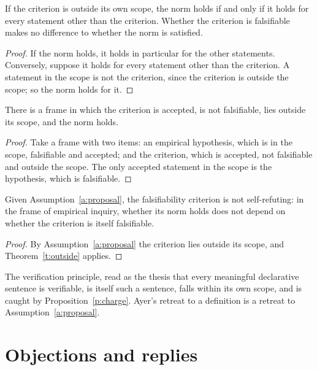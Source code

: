 \documentclass{situationist-preprint}
\begin{document}
\begin{theorem}\label{t:outside}
If the criterion is outside its own scope, the norm holds if and only if it holds for every statement other than the criterion. Whether the criterion is falsifiable makes no difference to whether the norm is satisfied.
\end{theorem}

\begin{proof}
If the norm holds, it holds in particular for the other statements. Conversely, suppose it holds for every statement other than the criterion. A statement in the scope is not the criterion, since the criterion is outside the scope; so the norm holds for it.
\end{proof}

\begin{proposition}[Consistency]\label{p:cons}
There is a frame in which the criterion is accepted, is not falsifiable, lies outside its scope, and the norm holds.
\end{proposition}

\begin{proof}
Take a frame with two items: an empirical hypothesis, which is in the scope, falsifiable and accepted; and the criterion, which is accepted, not falsifiable and outside the scope. The only accepted statement in the scope is the hypothesis, which is falsifiable.
\end{proof}

\begin{corollary}\label{c:main}
Given Assumption~\ref{a:proposal}, the falsifiability criterion is not self-refuting: in the frame of empirical inquiry, whether its norm holds does not depend on whether the criterion is itself falsifiable.
\end{corollary}

\begin{proof}
By Assumption~\ref{a:proposal} the criterion lies outside its scope, and Theorem~\ref{t:outside} applies.
\end{proof}

The verification principle, read as the thesis that every meaningful declarative sentence is verifiable, is itself such a sentence, falls within its own scope, and is caught by Proposition~\ref{p:charge}. Ayer's retreat to a definition is a retreat to Assumption~\ref{a:proposal}.

\section{Objections and replies}
\end{document}
